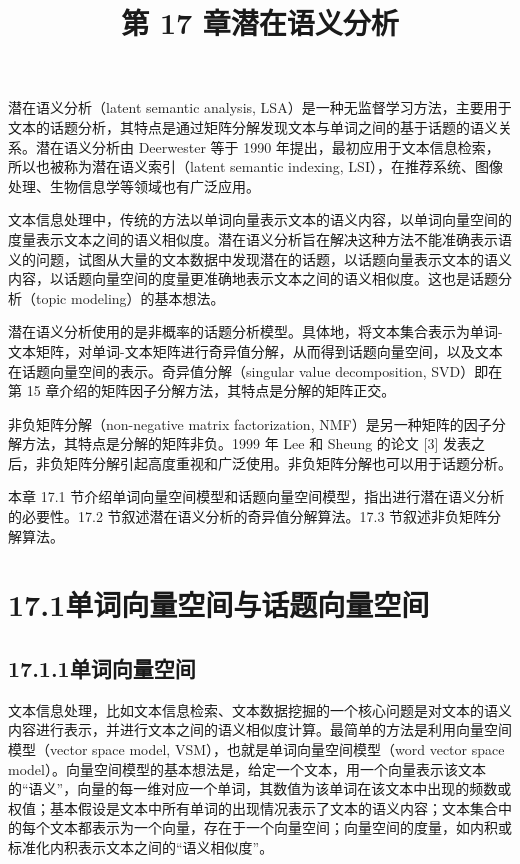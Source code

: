 \documentclass[UTF8, 12pt, fontset=fandol, oneside]{ctexart}
\title{第 17 章\quad 潜在语义分析}
\author{}
\date{}
\begin{document}
\maketitle

潜在语义分析（latent semantic analysis, LSA）是一种无监督学习方法，主要用于文本的话题分析，其特点是通过矩阵分解发现文本与单词之间的基于话题的语义关系。潜在语义分析由 Deerwester 等于 1990 年提出，最初应用于文本信息检索，所以也被称为潜在语义索引（latent semantic indexing, LSI），在推荐系统、图像处理、生物信息学等领域也有广泛应用。

文本信息处理中，传统的方法以单词向量表示文本的语义内容，以单词向量空间的度量表示文本之间的语义相似度。潜在语义分析旨在解决这种方法不能准确表示语义的问题，试图从大量的文本数据中发现潜在的话题，以话题向量表示文本的语义内容，以话题向量空间的度量更准确地表示文本之间的语义相似度。这也是话题分析（topic modeling）的基本想法。

潜在语义分析使用的是非概率的话题分析模型。具体地，将文本集合表示为单词-文本矩阵，对单词-文本矩阵进行奇异值分解，从而得到话题向量空间，以及文本在话题向量空间的表示。奇异值分解（singular value decomposition, SVD）即在第 15 章介绍的矩阵因子分解方法，其特点是分解的矩阵正交。

非负矩阵分解（non-negative matrix factorization, NMF）是另一种矩阵的因子分解方法，其特点是分解的矩阵非负。1999 年 Lee 和 Sheung 的论文 [3] 发表之后，非负矩阵分解引起高度重视和广泛使用。非负矩阵分解也可以用于话题分析。

本章 17.1 节介绍单词向量空间模型和话题向量空间模型，指出进行潜在语义分析的必要性。17.2 节叙述潜在语义分析的奇异值分解算法。17.3 节叙述非负矩阵分解算法。

\section*{17.1\quad 单词向量空间与话题向量空间}

\subsection*{17.1.1\quad 单词向量空间}

文本信息处理，比如文本信息检索、文本数据挖掘的一个核心问题是对文本的语义内容进行表示，并进行文本之间的语义相似度计算。最简单的方法是利用向量空间模型（vector space model, VSM），也就是单词向量空间模型（word vector space model）。向量空间模型的基本想法是，给定一个文本，用一个向量表示该文本的“语义”，向量的每一维对应一个单词，其数值为该单词在该文本中出现的频数或权值；基本假设是文本中所有单词的出现情况表示了文本的语义内容；文本集合中的每个文本都表示为一个向量，存在于一个向量空间；向量空间的度量，如内积或标准化内积表示文本之间的“语义相似度”。
\end{document}
